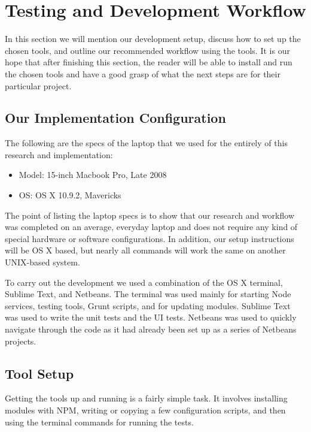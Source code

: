 \documentclass[12pt]{ucthesis}
\begin{document}
\chapter{Testing and Development Workflow}
In this section we will mention our development setup, discuss how to set up the chosen tools, and outline our recommended workflow using the tools. It is our hope that after finishing this section, the reader will be able to install and run the chosen tools and have a good grasp of what the next steps are for their particular project.

\section{Our Implementation Configuration}
The following are the specs of the laptop that we used for the entirely of this research and implementation:
\begin{itemize}
  \item Model: 15-inch Macbook Pro, Late 2008
  \item OS: OS X 10.9.2, Mavericks
\end{itemize}
The point of listing the laptop specs is to show that our research and workflow was completed on an average, everyday laptop and does not require any kind of special hardware or software configurations. In addition, our setup instructions will be OS X based, but nearly all commands will work the same on another UNIX-based system.

To carry out the development we used a combination of the OS X terminal, Sublime Text, and Netbeans. The terminal was used mainly for starting Node services, testing tools, Grunt scripts, and for updating modules. Sublime Text was used to write the unit tests and the UI tests. Netbeans was used to quickly navigate through the code as it had already been set up as a series of Netbeans projects.

\section{Tool Setup}
Getting the tools up and running is a fairly simple task. It involves installing modules with NPM, writing or copying a few configuration scripts, and then using the terminal commands for running the tests.
\end{document}
